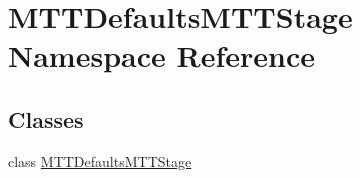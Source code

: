 \hypertarget{namespaceMTTDefaultsMTTStage}{\section{M\-T\-T\-Defaults\-M\-T\-T\-Stage Namespace Reference}
\label{namespaceMTTDefaultsMTTStage}
}
\subsection*{Classes}
\begin{DoxyCompactItemize}
\item 
class \hyperlink{classMTTDefaultsMTTStage_1_1MTTDefaultsMTTStage}{M\-T\-T\-Defaults\-M\-T\-T\-Stage}
\end{DoxyCompactItemize}
